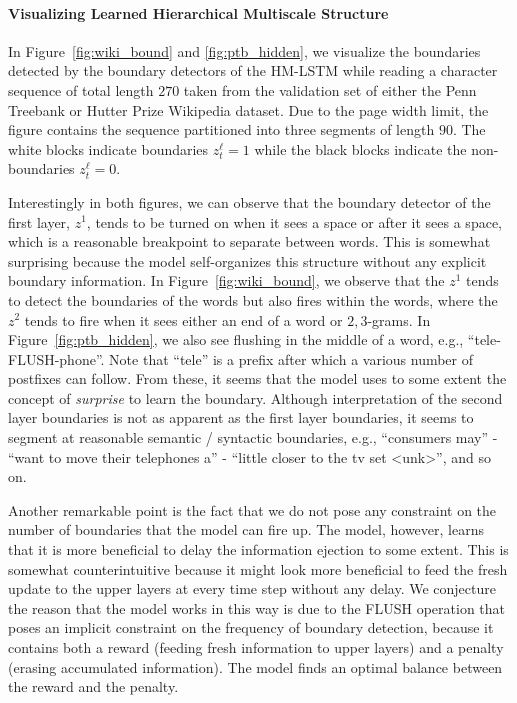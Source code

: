 \paragraph{Visualizing Learned Hierarchical Multiscale Structure}

In Figure~\ref{fig:wiki_bound} and \ref{fig:ptb_hidden}, we visualize the boundaries detected by the boundary detectors of the HM-LSTM while reading a character sequence of total length $270$ taken from the validation set of either the Penn Treebank or Hutter Prize Wikipedia dataset. Due to the page width limit, the figure contains the sequence partitioned into three segments of length $90$. The white blocks indicate boundaries $z^{\ell}_t=1$ while the black blocks indicate the non-boundaries $z^{\ell}_t=0$.

Interestingly in both figures, we can observe that the boundary detector of the first layer, $z^1$, tends to be turned on when it sees a space or after it sees a space, which is a reasonable breakpoint to separate between words. This is somewhat surprising because the model self-organizes this structure without any explicit boundary information. In Figure~\ref{fig:wiki_bound}, we observe that the $z^1$ tends to detect the boundaries of the words but also fires within the words, where the $z^2$ tends to fire when it sees either an end of a word or $2,3$-grams. In Figure~\ref{fig:ptb_hidden}, we also see flushing in the middle of a word, e.g., ``tele-FLUSH-phone''. Note that ``tele'' is a prefix after which a various number of postfixes can follow. From these, it seems that the model uses to some extent the concept of \textit{surprise} to learn the boundary. Although interpretation of the second layer boundaries is not as apparent as the first layer boundaries, it seems to segment at reasonable semantic / syntactic boundaries, e.g.,  ``consumers may'' - ``want to move their telephones a'' - ``little closer to the tv set <unk>'', and so on.

Another remarkable point is the fact that we do not pose any constraint on the number of boundaries that the model can fire up. The model, however, learns that it is more beneficial to delay the information ejection to some extent. This is somewhat counterintuitive because it might look more beneficial to feed the fresh update to the upper layers at every time step without any delay. We conjecture the reason that the model works in this way is due to the FLUSH operation that poses an implicit constraint on the frequency of boundary detection, because it contains both a reward (feeding fresh information to upper layers) and a penalty (erasing accumulated information). The model finds an optimal balance between the reward and the penalty.

